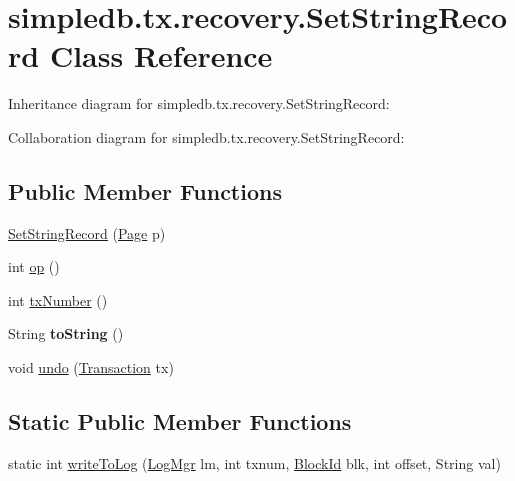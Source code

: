 \hypertarget{classsimpledb_1_1tx_1_1recovery_1_1SetStringRecord}{}\section{simpledb.\+tx.\+recovery.\+Set\+String\+Record Class Reference}
\label{classsimpledb_1_1tx_1_1recovery_1_1SetStringRecord}


Inheritance diagram for simpledb.\+tx.\+recovery.\+Set\+String\+Record\+:


Collaboration diagram for simpledb.\+tx.\+recovery.\+Set\+String\+Record\+:
\subsection*{Public Member Functions}
\begin{DoxyCompactItemize}
\item 
\hyperlink{classsimpledb_1_1tx_1_1recovery_1_1SetStringRecord_a9b47c768a4547fb1924271678a55f92c}{Set\+String\+Record} (\hyperlink{classsimpledb_1_1file_1_1Page}{Page} p)
\item 
int \hyperlink{classsimpledb_1_1tx_1_1recovery_1_1SetStringRecord_a87005ca427089666bd5d1c96ce4fa29d}{op} ()
\item 
int \hyperlink{classsimpledb_1_1tx_1_1recovery_1_1SetStringRecord_adcd0381963f274bf07aeb2e615ba6c8f}{tx\+Number} ()
\item 
\mbox{\label{classsimpledb_1_1tx_1_1recovery_1_1SetStringRecord_a78b6b23006f82137b962153e74799357}} 
String {\bfseries to\+String} ()
\item 
void \hyperlink{classsimpledb_1_1tx_1_1recovery_1_1SetStringRecord_a34e8c9a212d3dfcd8f36774271d8cb38}{undo} (\hyperlink{classsimpledb_1_1tx_1_1Transaction}{Transaction} tx)
\end{DoxyCompactItemize}
\subsection*{Static Public Member Functions}
\begin{DoxyCompactItemize}
\item 
static int \hyperlink{classsimpledb_1_1tx_1_1recovery_1_1SetStringRecord_a47c5a58fa49e28c24f8111983ab2fc85}{write\+To\+Log} (\hyperlink{classsimpledb_1_1log_1_1LogMgr}{Log\+Mgr} lm, int txnum, \hyperlink{classsimpledb_1_1file_1_1BlockId}{Block\+Id} blk, int offset, String val)
\end{DoxyCompactItemize}
